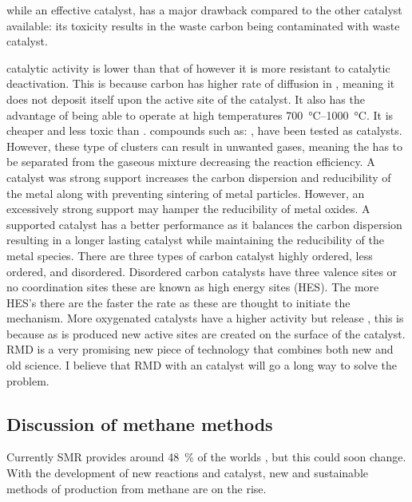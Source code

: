 \begin{multicols}{2}

 while an effective catalyst, has a major drawback compared to the other catalyst available: its toxicity results in the waste carbon being contaminated with waste  catalyst.
 
 catalytic activity is lower than that of  however it is more resistant to catalytic deactivation.
This is because carbon has higher rate of diffusion in , meaning it does not deposit itself upon the active site of the catalyst.
It also has the advantage of being able to operate at high temperatures \SIrange{700}{1000}{\celsius}.
It is cheaper and less toxic than .
 compounds such as: \ce{[Fe(CO)5]}, \ce{[Fe(cp)2]} have been tested as catalysts.
However, these type of clusters can result in unwanted gases, meaning the  has to be separated from the gaseous mixture decreasing the reaction efficiency.
A catalyst was strong support increases the carbon dispersion and reducibility of the metal along with preventing sintering of metal particles.
However, an excessively strong support may hamper the reducibility of metal oxides.
A supported catalyst has a better performance as it balances the carbon dispersion resulting in a longer lasting catalyst while maintaining the reducibility of the metal species.
There are three types of carbon catalyst highly ordered, less ordered, and disordered.
Disordered carbon catalysts have three valence sites or no coordination sites these are known as high energy sites (HES).
The more HES’s there are the faster the rate as these are thought to initiate the mechanism.
More oxygenated catalysts have a higher activity but release , this is because as  is produced new active sites are created on the surface of the catalyst.
RMD is a very promising new piece of technology that combines both new and old science.
I believe that RMD with an  catalyst will go a long way to solve the  problem.

\subsection{Discussion of methane methods}%
\label{sub:discussion_of_methane_methods}
Currently SMR provides around \SI{48}{\percent} of the worlds \cite{SBN2020}, but this could soon change.
With the development of new reactions and catalyst, new and sustainable methods of  production from methane are on the rise.


\end{multicols}
